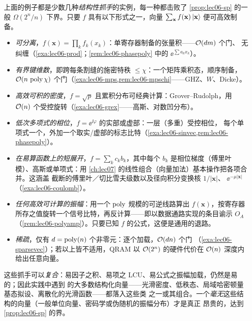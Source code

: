 \begin{remark}[易于制备的振幅向量工具箱]
\label{rem:lec06-toolbox}
上面的例子都是少数几种\emph{结构性抓手}的实例，每一种都击败了 \cref{prop:lec06-sp} 的一般
$\Omega(2^n/n)$ 下界。只要 $f$ 具有以下形式之一，向量
$\sum_{\mathbf x}f(\mathbf x)\ket{\mathbf x}$ 便可高效制备。
\begin{itemize}[leftmargin=1.4em,nosep]
  \item \emph{可分离}，$f(\mathbf x)=\prod_k f_k(x_k)$：单寄存器制备的张量积——$\mathcal{O}(dm)$ 个门、
        无纠缠（\cref{exa:lec06-prod}；\cref{rem:lec06-phasepoly} 中的 $\ee^{\sum a_kx_k}$）。
  \item \emph{有界键维数}，即跨每条割缝的施密特秩 $\le\chi$：一个矩阵乘积态，顺序制备，
        $\mathcal{O}(n\,\operatorname{poly}\chi)$ 个门（\cref{exa:lec06-mps,rem:lec06-mpschi}——GHZ、$W$、Dicke）。
  \item \emph{高效可积的密度}，$f=\sqrt{p}$ 且累积分布可经典计算：Grover--Rudolph，用
        $\mathcal{O}(n)$ 个受控旋转（\cref{exa:lec06-grex}——高斯、对数凹分布）。
  \item \emph{低次多项式的相位}，$f=\ee^{\ii\varphi}$ 的实部或虚部：一层（多重）受控相位，
        每个单项式一个，外加一个取实/虚部的标志比特（\cref{exa:lec06-sinvec,rem:lec06-phasepoly}）。
  \item \emph{在易算函数上的短展开}，$f=\sum_{k} c_k b_k$，其中每个 $b_k$ 是相位梯度（傅里叶
        模）、高斯或单项式：用 \cref{ch:lec07} 的线性组合（向量加法）基本操作把各项合并。这涵盖
        截断的傅里叶／切比雪夫级数以及径向积分变换核 $1/\lvert\mathbf x\rvert$、
        $\ee^{-\mu\lvert\mathbf x\rvert}$（\cref{exa:lec06-coulomb}）。
  \item \emph{任何高效可计算的振幅}：用一个 $\operatorname{poly}$ 规模的可逆线路算出 $f(\mathbf x)$，按寄存器
        所存之值旋转一个信号比特，再反计算——即以数据通路实现的条目谕示 $O_A$
        （\cref{rem:lec06-polyamp}）。只要已知 $f$ 的公式，这便是通用的退路。
  \item \emph{稀疏}，仅有 $d=\operatorname{poly}(n)$ 个非零元：逐个加载，$\mathcal{O}(dn)$ 个门
        （\cref{exa:lec06-sparsevec}）；若以上皆不适用，QRAM 以 $\mathcal{O}(2^n)$ 的硬件代价在
        $\mathcal{O}(n)$ 深度内给出任意向量。
\end{itemize}
这些抓手可以\emph{复合}：易因子之积、易项之 LCU、易公式之振幅加载，仍然是易的；因此实践中遇到
的大多数结构化向量——光滑密度、低秩态、局域哈密顿量基态拟设、离散化的光滑函数——都落入这些类
之一或其组合。一个\emph{毫无}这些结构的向量（一般单位向量、密码学或伪随机的振幅分布）才是真正
昂贵的，达到 \cref{prop:lec06-sp} 的界。
\end{remark}

